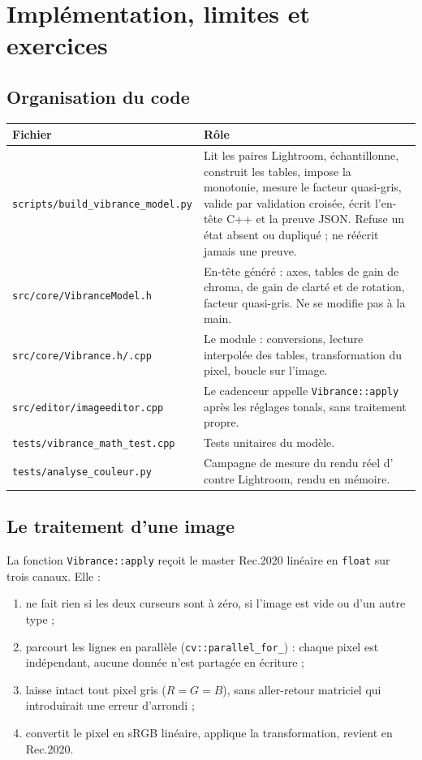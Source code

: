 \chapter{Implémentation, limites et exercices}

\section{Organisation du code}
\begin{longtable}{p{5.6cm}p{9.4cm}}
\toprule Fichier & Rôle\\ \midrule
\small\texttt{scripts/\allowbreak build\_vibrance\_model.py} & Lit les paires Lightroom,
échantillonne, construit les tables, impose la monotonie, mesure le facteur
quasi-gris, valide par validation croisée, écrit l'en-tête C++ et la preuve
JSON. Refuse un état absent ou dupliqué ; ne réécrit jamais une preuve.\\
\small\texttt{src/\allowbreak core/\allowbreak VibranceModel.h} & En-tête généré : axes, tables de gain de
chroma, de gain de clarté et de rotation, facteur quasi-gris. Ne se modifie
pas à la main.\\
\small\texttt{src/\allowbreak core/\allowbreak Vibrance.h/\allowbreak .cpp} & Le module : conversions, lecture
interpolée des tables, transformation du pixel, boucle sur l'image.\\
\small\texttt{src/\allowbreak editor/\allowbreak imageeditor.cpp} & Le cadenceur appelle
\texttt{Vibrance::apply} après les réglages tonals, sans traitement propre.\\
\small\texttt{tests/\allowbreak vibrance\_math\_test.cpp} & Tests unitaires du modèle.\\
\small\texttt{tests/\allowbreak analyse\_couleur.py} & Campagne de mesure du rendu réel
d'\IPR{} contre Lightroom, rendu en mémoire.\\
\bottomrule
\end{longtable}

\section{Le traitement d'une image}
La fonction \texttt{Vibrance::apply} reçoit le master Rec.2020 linéaire en
\texttt{float} sur trois canaux. Elle :
\begin{enumerate}
\item ne fait rien si les deux curseurs sont à zéro, si l'image est vide ou
d'un autre type ;
\item parcourt les lignes en parallèle (\texttt{cv::parallel\_for\_}) : chaque
pixel est indépendant, aucune donnée n'est partagée en écriture ;
\item laisse intact tout pixel gris ($R=G=B$), sans aller-retour matriciel qui
introduirait une erreur d'arrondi ;
\item convertit le pixel en sRGB linéaire, applique la transformation, revient
en Rec.2020.
\end{enumerate}

